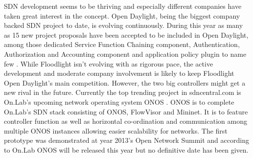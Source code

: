 SDN development seems to be thriving and especially different companies have taken great interest in the concept. Open Daylight, being the biggest company backed SDN project to date, is evolving continuously. During this year as many as 15 new project proposals have been accepted to be included in Open Daylight, among those dedicated Service Function Chaining component, Authentication, Authorization and Accounting component and application policy plugin to name few \cite{projects}. While Floodlight isn't evolving with as rigorous pace, the active development and moderate company involvement is likely to keep Floodlight Open Daylight's main competition. However, the two big controllers might get a new rival in the future. Currently the top trending project in sdncentral.com is On.Lab's upcoming network operating system ONOS \cite{SDNCentral, ONOS}. ONOS is to complete On.Lab's SDN stack consisting of ONOS, FlowVisor and Mininet. It is to feature controller function as well as horizontal co-ordination and communication among multiple ONOS instances allowing easier scalability for networks. The first prototype was demonstrated at year 2013's Open Network Summit and according to On.Lab ONOS will be released this year but no definitive date has been given.

\clearpage
